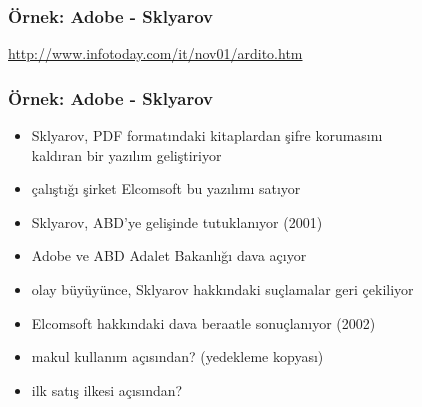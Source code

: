 \documentclass[dvipsnames]{beamer}
\theoremstyle{definition}
\theoremstyle{example}
\theoremstyle{plain}
\begin{document}
\begin{frame}
  \frametitle{Örnek: Adobe - Sklyarov}

  \begin{center}
  \end{center}

  \medskip
  \tiny{\url{http://www.infotoday.com/it/nov01/ardito.htm}}\\
\end{frame}

\begin{frame}
  \frametitle{Örnek: Adobe - Sklyarov}

  \begin{itemize}
    \item Sklyarov, PDF formatındaki kitaplardan şifre korumasını\\
      kaldıran bir yazılım geliştiriyor
    \item çalıştığı şirket Elcomsoft bu yazılımı satıyor
    \item Sklyarov, ABD'ye gelişinde tutuklanıyor (2001)
    \item Adobe ve ABD Adalet Bakanlığı dava açıyor
    \item olay büyüyünce, Sklyarov hakkındaki suçlamalar geri çekiliyor
    \item Elcomsoft hakkındaki dava beraatle sonuçlanıyor (2002)

    \pause
    \medskip
    \item makul kullanım açısından? (yedekleme kopyası)
    \item ilk satış ilkesi açısından?
  \end{itemize}
\end{frame}
\end{document}
